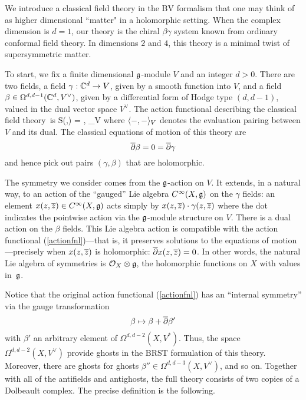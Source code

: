 
We introduce a classical field theory in the BV formalism that one may think of as higher dimensional ``matter" in a holomorphic setting. 
When the complex dimension is $d = 1$, our theory is the chiral $\beta\gamma$ system known from ordinary conformal field theory. 
In dimensions $2$ and $4$, this theory is a minimal twist of supersymmetric matter. 

To start, we fix a finite dimensional $\mathfrak g$-module $V$ and an integer $d > 0$.
There are two fields, a field $\gamma : \mathbb C^d \to V$, given by a smooth function into $V$, and
a field $\beta \in \Omega^{d,d-1}(\mathbb C^d, V^\vee)$, 
given by a differential form of Hodge type $(d,d-1)$, valued in the dual vector space $V^\vee$. 
The action functional describing the classical field theory~is
\beqn\label{actionfnl}
S(\gamma,\beta) = \int \<\beta, \dbar\gamma\>_V
\eeqn
where $\langle-,-\rangle_V$ denotes the evaluation pairing between $V$ and its dual. 
The classical equations of motion of this theory are 
\[
\overline{\partial} \beta = 0 =\overline{\partial} \gamma
\]
and hence pick out pairs $(\gamma,\beta)$ that are holomorphic. 

The symmetry we consider comes from the $\mathfrak g$-action on $V$. 
It extends, in a natural way, to an action of the ``gauged'' Lie algebra $C^\infty(X, \mathfrak g)$ on the $\gamma$ fields: an element $x(z,\overline{z}) \in C^\infty(X,\mathfrak g)$ acts simply by $x(z,\overline{z}) \cdot \gamma(z,\overline{z})$ where the dot indicates the pointwise action via the $\mathfrak g$-module structure on $V$. 
There is a dual action on the $\beta$ fields.
This Lie algebra action is compatible with the action functional (\ref{actionfnl})---that is, it preserves solutions to the equations of motion---precisely when $x(z,\overline{z})$ is holomorphic: $\overline{\partial} x(z,\overline{z}) = 0$. 
In other words, the natural Lie algebra of symmetries is $\mathcal O_X \otimes \mathfrak g$, the holomorphic functions on $X$ with values in~$\mathfrak g$.


Notice that the original action functional (\ref{actionfnl}) has an ``internal symmetry'' via the gauge transformation
\[
\beta \mapsto \beta + \overline{\partial} \beta' 
\]
with $\beta'$ an arbitrary element of $\Omega^{d,d-2} (X, V^*)$. 
Thus, the space $\Omega^{d,d-2} (X, V^\vee)$ provide ghosts in the BRST formulation of this theory. 
Moreover, there are ghosts for ghosts $\beta'' \in \Omega^{d,d-3}(X , V^\vee)$, and so on.
Together with all of the antifields and antighosts, the full theory consists of two copies of a Dolbeault complex.
The precise definition is the following.

